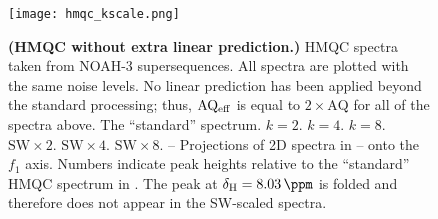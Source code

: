 \begin{figure}
    \centering
    \texttt{[image: hmqc\_kscale.png]}
    {\label{fig:hmqc_kscale_std}}
    {\label{fig:hmqc_kscale_k2}}
    {\label{fig:hmqc_kscale_k4}}
    {\label{fig:hmqc_kscale_k8}}
    {\label{fig:hmqc_kscale_sw2}}
    {\label{fig:hmqc_kscale_sw4}}
    {\label{fig:hmqc_kscale_sw8}}
    {\label{fig:hmqc_kscale_std_proj}}
    {\label{fig:hmqc_kscale_k2_proj}}
    {\label{fig:hmqc_kscale_k4_proj}}
    {\label{fig:hmqc_kscale_k8_proj}}
    {\label{fig:hmqc_kscale_sw2_proj}}
    {\label{fig:hmqc_kscale_sw4_proj}}
    {\label{fig:hmqc_kscale_sw8_proj}}
    \caption{
        \textbf{(HMQC without extra linear prediction.)}
        \nitrogen{} HMQC spectra taken from NOAH-3  supersequences.
        All spectra are plotted with the same noise levels.
        No linear prediction has been applied beyond the standard processing; thus, $\mathrm{AQ_{eff}}$ is equal to $2 \times \mathrm{AQ}$ for all of the spectra above.
        \textbf{} The ``standard'' spectrum.
        \textbf{} $k = 2$.
        \textbf{} $k = 4$.
        \textbf{} $k = 8$.
        \textbf{} $\mathrm{SW} \times 2$.
        \textbf{} $\mathrm{SW} \times 4$.
        \textbf{} $\mathrm{SW} \times 8$.
        \textbf{}--\textbf{} Projections of 2D spectra in -- onto the $f_1$ axis.
        Numbers indicate peak heights relative to the ``standard'' HMQC spectrum in .
        The peak at $\delta_{\ce{H}} = \SI{8.03}{\ppm}$ is folded and therefore does not appear in the SW-scaled spectra.
        \grami{}
    }
    \label{fig:hmqc_kscale}
\end{figure}

